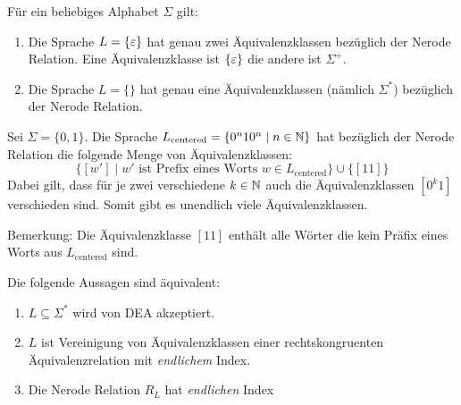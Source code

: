 \begin{Bsp}
      Für ein beliebiges Alphabet $\Sigma$ gilt:
      \begin{enumerate}
       \item Die Sprache $L=\{\varepsilon\}$ hat genau zwei Äquivalenzklassen bezüglich der Nerode Relation.
      Eine Äquivalenzklasse ist $\{\varepsilon\}$ die andere ist $\Sigma^+$.
       \item Die Sprache $L=\{\}$ hat genau eine Äquivalenzklassen (nämlich $\Sigma^*$) bezüglich der Nerode Relation.
      \end{enumerate}
\end{Bsp}

\begin{Bsp}
Sei $\Sigma=\{0,1\}$. Die Sprache $L_\text{centered}=\{0^n10^n \mid n\in\mathbb{N}\}$ hat bezüglich der Nerode Relation die folgende Menge von Äquivalenzklassen:
$$\{ [w'] \mid w' \text{ ist Prefix eines Worts } w\in L_\text{centered}\} \cup \{ [11] \}$$
Dabei gilt, dass für je zwei verschiedene $k\in\mathbb{N}$
auch die Äquivalenzklassen $[0^k1]$ verschieden sind. Somit gibt es unendlich viele Äquivalenzklassen.

Bemerkung: Die Äquivalenzklasse $[11]$ enthält alle Wörter die kein Präfix eines Worts aus $L_\text{centered}$ sind.
 
\end{Bsp}



\begin{Satz} %
        Die folgende Aussagen sind äquivalent:
        \begin{enumerate}
                \item\label{itm:Nerode1} $L\subseteq \Sigma^*$ wird von \ac{DEA} akzeptiert.
                \item\label{itm:Nerode2} $L$ ist Vereinigung von Äquivalenzklassen einer rechtskongruenten Äquivalenzrelation mit \emph{endlichem} Index.
                \item\label{itm:Nerode3} Die Nerode Relation $R_L$ hat \emph{endlichen} Index
        \end{enumerate}
\end{Satz}


